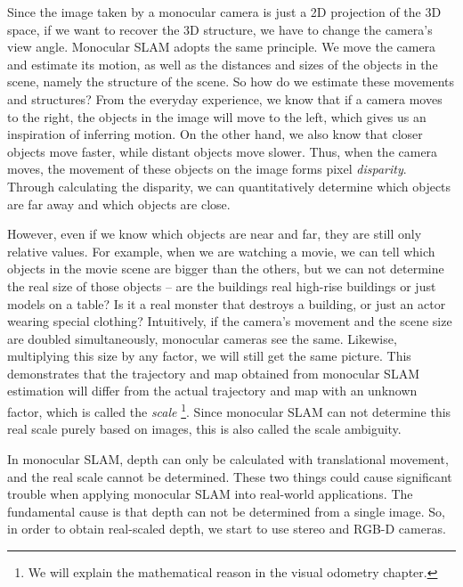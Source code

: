 Since the image taken by a monocular camera is just a 2D projection of the 3D space, if we want to recover the 3D structure, we have to change the camera's view angle. Monocular SLAM adopts the same principle. We move the camera and estimate its motion, as well as the distances and sizes of the objects in the scene, namely the structure of the scene. So how do we estimate these movements and structures? From the everyday experience, we know that if a camera moves to the right, the objects in the image will move to the left, which gives us an inspiration of inferring motion. On the other hand, we also know that closer objects move faster, while distant objects move slower. Thus, when the camera moves, the movement of these objects on the image forms pixel \textit{disparity}. Through calculating the disparity, we can quantitatively determine which objects are far away and which objects are close.

However, even if we know which objects are near and far, they are still only relative values. For example, when we are watching a movie, we can tell which objects in the movie scene are bigger than the others, but we can not determine the real size of those objects -- are the buildings real high-rise buildings or just models on a table? Is it a real monster that destroys a building, or just an actor wearing special clothing? Intuitively, if the camera's movement and the scene size are doubled simultaneously, monocular cameras see the same. Likewise, multiplying this size by any factor, we will still get the same picture. This demonstrates that the trajectory and map obtained from monocular SLAM estimation will differ from the actual trajectory and map with an unknown factor, which is called the \textit{scale} \footnote{We will explain the mathematical reason in the visual odometry chapter.}. Since monocular SLAM can not determine this real scale purely based on images, this is also called the scale ambiguity.

In monocular SLAM, depth can only be calculated with translational movement, and the real scale cannot be determined. These two things could cause significant trouble when applying monocular SLAM into real-world applications. The fundamental cause is that depth can not be determined from a single image. So, in order to obtain real-scaled depth, we start to use stereo and RGB-D cameras.

